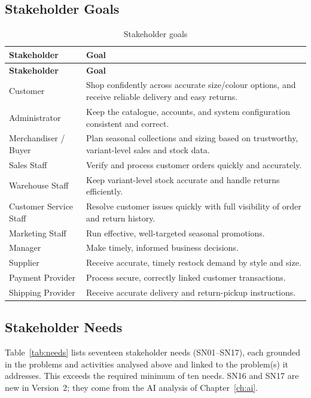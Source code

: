 \documentclass[11pt,a4paper,oneside]{extreport}
\newif\ifshowvtwo
\newcommand{\upd}[1]{\ifshowvtwo\textcolor{red}{#1}\else#1\fi}
\begin{document}
\subsection{Stakeholder Goals}
\begin{xltabular}{\textwidth}{@{}L{4cm} Y@{}}
\caption{Stakeholder goals}\label{tab:goals}\\
\toprule
\textbf{Stakeholder} & \textbf{Goal} \\ \midrule
\endfirsthead
\toprule
\textbf{Stakeholder} & \textbf{Goal} \\ \midrule
\endhead
\bottomrule
\endlastfoot
Customer & Shop confidently across accurate size/colour options, and receive reliable delivery and easy returns. \\
Administrator & Keep the catalogue, accounts, and system configuration consistent and correct. \\
Merchandiser / Buyer & Plan seasonal collections and sizing based on trustworthy, variant-level sales and stock data. \\
Sales Staff & Verify and process customer orders quickly and accurately. \\
Warehouse Staff & Keep variant-level stock accurate and handle returns efficiently. \\
Customer Service Staff & Resolve customer issues quickly with full visibility of order and return history. \\
Marketing Staff & Run effective, well-targeted seasonal promotions. \\
Manager & Make timely, informed business decisions. \\
Supplier & Receive accurate, timely restock demand by style and size. \\
Payment Provider & Process secure, correctly linked customer transactions. \\
Shipping Provider & Receive accurate delivery and return-pickup instructions. \\
\end{xltabular}

\subsection{Stakeholder Needs}
Table~\ref{tab:needs} lists \upd{seventeen} stakeholder needs (\upd{SN01--SN17}), each grounded in the problems and activities analysed above and linked to the problem(s) it addresses. This exceeds the required minimum of ten needs. \upd{SN16 and SN17 are new in Version~2; they come from the AI analysis of Chapter~\ref{ch:ai}.}
\end{document}
